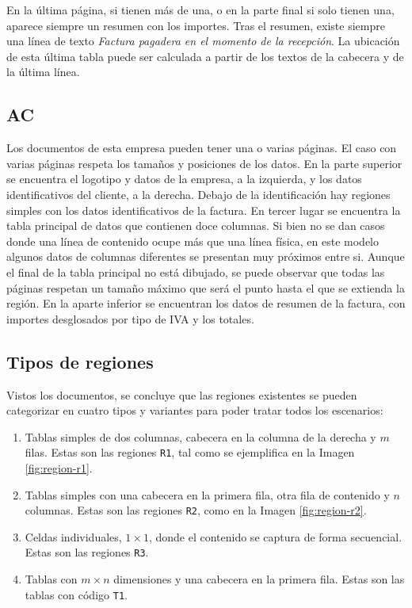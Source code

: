 En la última página, si tienen más de una, o en la parte final si solo tienen una, aparece siempre un resumen con los importes. Tras el resumen, existe siempre una línea de texto \emph{Factura pagadera en el momento de la recepción}. La ubicación de esta última tabla puede ser calculada a partir de los textos de la cabecera y de la última línea.

\subsection{AC}

Los documentos de esta empresa pueden tener una o varias páginas. El caso con varias páginas respeta los tamaños y posiciones de los datos. En la parte superior se encuentra el logotipo y datos de la empresa, a la izquierda, y los datos identificativos del cliente, a la derecha. Debajo de la identificación hay regiones simples con los datos identificativos de la factura. En tercer lugar se encuentra la tabla principal de datos que contienen doce columnas. Si bien no se dan casos donde una línea de contenido ocupe más que una línea física, en este modelo algunos datos de columnas diferentes se presentan muy próximos entre si. Aunque el final de la tabla principal no está dibujado, se puede observar que todas las páginas respetan un tamaño máximo que será el punto hasta el que se extienda la región. En la aparte inferior se encuentran los datos de resumen de la factura, con importes desglosados por tipo de IVA y los totales.
 
\subsection{Tipos de regiones}

Vistos los documentos, se concluye que las regiones existentes se pueden categorizar en cuatro tipos y variantes para poder tratar todos los escenarios:

\begin{enumerate}
	\item Tablas simples de dos columnas, cabecera en la columna de la derecha y $m$ filas. Estas son las regiones \verb|R1|, tal como se ejemplifica en la Imagen \ref{fig:region-r1}.
	\item Tablas simples con una cabecera en la primera fila, otra fila de contenido y $n$ columnas. Estas son las regiones \verb|R2|, como en la Imagen \ref{fig:region-r2}.
	\item Celdas individuales, $1\times 1$, donde el contenido se captura de forma secuencial. Estas son las regiones \verb|R3|.
	\item Tablas con $m\times n$ dimensiones y una cabecera en la primera fila. Estas son las tablas con código \verb|T1|.
\end{enumerate}

